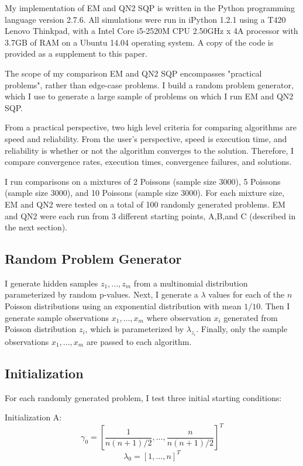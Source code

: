 \documentclass[letter,12pt]{article}
\begin{document}
My implementation of EM and QN2 SQP is written in the Python programming language version 2.7.6.  All simulations were run in iPython 1.2.1 using a T420 Lenovo Thinkpad, with a Intel Core i5-2520M CPU 2.50GHz x 4A processor with 3.7GB of RAM on a Ubuntu 14.04 operating system.  A copy of the code is provided as a supplement to this paper.

The scope of my comparison EM and QN2 SQP encompasses "practical problems", rather than edge-case problems.  I build a random problem generator, which I use to generate a large sample of problems on which I run EM and QN2 SQP.  

From a practical perspective, two high level criteria for comparing algorithms are speed and reliability.  From the user's perspective, speed is execution time, and reliability is whether or not the algorithm converges to the solution.  Therefore, I compare convergence rates, execution times, convergence failures, and solutions.

I run comparisons on a mixtures of 2 Poissons (sample size 3000), 5 Poissons (sample size 3000), and 10 Poissons (sample size 3000).  For each mixture size, EM and QN2 were tested on a total of 100 randomly generated problems.  EM and QN2 were each run from 3 different starting points, A,B,and C (described in the next section).

\subsection{Random Problem Generator}

I generate hidden samples $z_1,...,z_m$ from a multinomial distribution parameterized by random p-values.  Next, I generate a $\lambda$ values for each of the $n$ Poisson distributions using an exponential distribution with mean $1/10$.  Then I generate sample observations $x_1,...,x_m$ where observation $x_i$ generated from Poisson distribution $z_i$, which is parameterized by $\lambda_{z_i}$.  Finally, only the sample observations $x_1,...,x_m$ are passed to each algorithm.

\subsection{Initialization}

For each randomly generated problem, I test three initial starting conditions:

Initialization A:
\[
\gamma_0 = [\frac{1}{n(n+1)/2},...,\frac{n}{n(n+1)/2}]^T
\]
\[
\lambda_0 = [1,...,n]^T
\]
\end{document}
